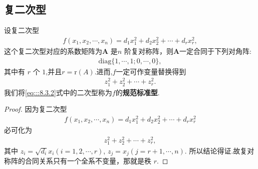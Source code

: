 \documentclass[../../main.tex]{subfiles}%
\begin{document}
\subsection{复二次型}

\begin{theorem}[复二次型的规范标准型]\label{theorem:复二次型的规范标准型}
设复二次型
\begin{align*}
f(x_1,x_2,\cdots,x_n)=d_1x_1^2 + d_2x_2^2 + \cdots + d_rx_r^2,
\end{align*}
这个复二次型对应的系数矩阵为$\boldsymbol{A}$ 是$n$ 阶复对称阵，则$\boldsymbol{A}$一定合同于下列对角阵:
\begin{align}
\mathrm{diag}\{1,\cdots,1;0,\cdots,0\},\label{eq:::8.3.3}
\end{align}
其中有 $r$ 个 $1$,并且$r=\mathrm{r}\left( A \right)$.进而,$f$一定可作变量替换得到
\begin{align}
z_1^2 + z_2^2 + \cdots + z_r^2.\label{eq:::8.3.2}
\end{align}
我们将\eqref{eq:::8.3.2}式中的二次型称为$f$的\textbf{规范标准型}.
\end{theorem}
\begin{proof}
因为复二次型
\begin{align*}
f(x_1,x_2,\cdots,x_n)=d_1x_1^2 + d_2x_2^2 + \cdots + d_rx_r^2
\end{align*}
必可化为
\begin{align*}
z_1^2 + z_2^2 + \cdots + z_r^2,
\end{align*}
其中 $z_i = \sqrt{d_i}x_i (i = 1,2,\cdots,r)$, $z_j = x_j (j = r + 1,\cdots,n)$. 所以结论得证.故复对称阵的合同关系只有一个全系不变量，那就是秩 $r$. 
\end{proof}
\end{document}

